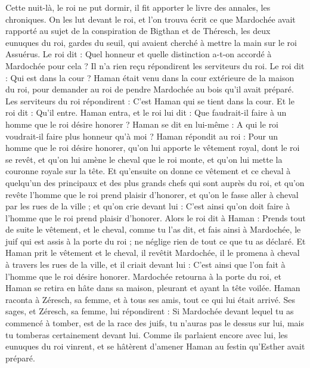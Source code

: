 \begin{multicols}{2}
\VerseOne{}Cette nuit-là, le roi ne put dormir, il fit apporter le livre des annales, les chroniques. On les lut devant le roi,
et l’on trouva écrit ce que Mardochée avait rapporté au sujet de la conspiration de Bigthan et de Théresch, les deux eunuques du roi, gardes du seuil, qui avaient cherché à mettre la main sur le roi Assuérus.
Le roi dit : Quel honneur et quelle distinction a-t-on accordé à Mardochée pour cela ? Il n’a rien reçu répondirent les serviteurs du roi.
Le roi dit : Qui est dans la cour ? Haman était venu dans la cour extérieure de la maison du roi, pour demander au roi de pendre Mardochée au bois qu'il avait préparé.
Les serviteurs du roi répondirent : C’est Haman qui se tient dans la cour. Et le roi dit : Qu'il entre.
Haman entra, et le roi lui dit : Que faudrait-il faire à un homme que le roi désire honorer ? Haman se dit en lui-même : A qui le roi voudrait-il faire plus honneur qu'à moi ?
Haman répondit au roi : Pour un homme que le roi désire honorer,
qu’on lui apporte le vêtement royal, dont le roi se revêt, et qu'on lui amène le cheval que le roi monte, et qu'on lui mette la couronne royale sur la tête.
Et qu'ensuite on donne ce vêtement et ce cheval à quelqu'un des principaux et des plus grands chefs qui sont auprès du roi, et qu'on revête l'homme que le roi prend plaisir d'honorer, et qu'on le fasse aller à cheval par les rues de la ville ; et qu'on crie devant lui : C'est ainsi qu'on doit faire à l'homme que le roi prend plaisir d'honorer.
Alors le roi dit à Haman : Prends tout de suite le vêtement, et le cheval, comme tu l'as dit, et fais ainsi à Mardochée, le juif qui est assis à la porte du roi ; ne néglige rien de tout ce que tu as déclaré.
Et Haman prit le vêtement et le cheval, il revêtit Mardochée, il le promena à cheval à travers les rues de la ville, et il criait devant lui : C'est ainsi que l’on fait à l'homme que le roi désire honorer.
Mardochée retourna à la porte du roi, et Haman se retira en hâte dans sa maison, pleurant et ayant la tête voilée.
Haman raconta à Zéresch, sa femme, et à tous ses amis, tout ce qui lui était arrivé. Ses sages, et Zéresch, sa femme, lui répondirent : Si Mardochée devant lequel tu as commencé à tomber, est de la race des juifs, tu n'auras pas le dessus sur lui, mais tu tomberas certainement devant lui.
Comme ils parlaient encore avec lui, les eunuques du roi vinrent, et se hâtèrent d'amener Haman au festin qu'Esther avait préparé.

\end{multicols}
